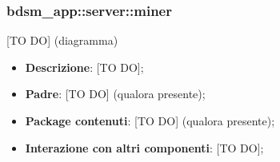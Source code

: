 


\subsubsection{bdsm\_app::server::miner} %
\label{ssub:bdsm_app_server_miner}
[TO DO] (diagramma) \newline \newline

\begin{itemize}
  \item \textbf{Descrizione}: [TO DO];
  \item \textbf{Padre}: [TO DO] (qualora presente);
  \item \textbf{Package contenuti}: [TO DO] (qualora presente);
  \item \textbf{Interazione con altri componenti}: [TO DO];
\end{itemize}
